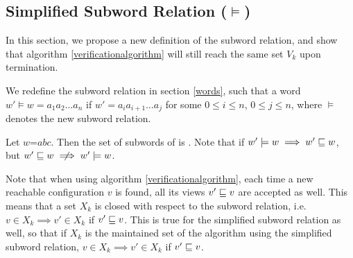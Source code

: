 \subsection{Simplified Subword Relation ($\models$)}
In this section, we propose a new definition of the subword relation, and show that algorithm \ref{verificationalgorithm} will still reach the same set $V_k$ upon termination.

\begin{defn}
\label{newsubword}
We redefine the subword relation in section \ref{words}, such that a word $w' \models w = a_1a_2\ldots a_n$ if $w' = a_ia_{i+1}\ldots a_j$ for some $0 \leq i \leq n$, $0 \leq j \leq n$, where $\models$ denotes the new subword relation. 
\end{defn}
\begin{exmp}
Let $w$=$abc$. Then the set of subwords of  is . Note that if $w' \models w \implies w' \sqsubseteq w$, but $w' \subword w \centernot\implies w' \models w$. 
\end{exmp}

Note that when using algorithm \ref{verificationalgorithm}, each time a new reachable configuration $v$ is found, all its views $v' \sqsubseteq v$ are accepted as well. This means that a set $X_k$ is closed with respect to the subword relation, i.e. $v \in X_k \implies v' \in X_k$ if $v' \sqsubseteq v$. This is true for the simplified subword relation as well, so that if $X_k$ is the maintained set of the algorithm using the simplified subword relation, $v \in X_k \implies v' \in X_k$ if $v' \sqsubseteq v$.

